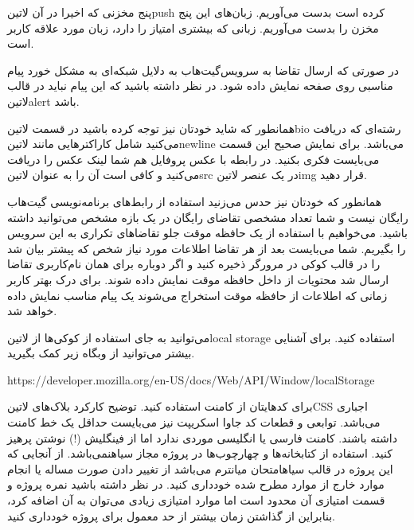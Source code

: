  پنج مخزنی که اخیرا در آن ‌لاتین{push} کرده است بدست می‌آوریم.
 زبان‌های این پنج مخزن را بدست می‌آوریم.
 زبانی که بیشتری امتیاز را دارد، زبان مورد علاقه کاربر است.

در صورتی که ارسال تقاضا به سرویس‌گیت‌هاب به دلایل شبکه‌ای به مشکل خورد پیام مناسبی روی صفحه نمایش داده شود.
در نظر داشته باشید که این پیام نباید در قالب ‌لاتین{alert} باشد.

همانطور که شاید خودتان نیز توجه کرده باشید در قسمت ‌لاتین{bio} رشته‌ای که دریافت می‌کنید شامل کاراکترهایی مانند ‌لاتین{newline} می‌باشد. برای نمایش صحیح این قسمت می‌بایست فکری بکنید.
در رابطه با عکس پروفایل هم شما لینک عکس را دریافت می‌کنید و کافی است آن را به عنوان ‌لاتین{src} در یک عنصر ‌لاتین{img} قرار دهید.

همانطور که خودتان نیز حدس می‌زنید استفاده از رابط‌های برنامه‌نویسی گیت‌هاب رایگان نیست و شما تعداد مشخصی تقاضای رایگان در یک بازه مشخص می‌توانید داشته
باشید. می‌خواهیم با استفاده از یک حافظه موقت جلو تقاضاهای تکراری به این سرویس را بگیریم. شما می‌بایست بعد از هر تقاضا اطلاعات مورد نیاز شخص که پیشتر
بیان شد را در قالب کوکی در مرورگر ذخیره کنید و اگر دوباره برای همان نام‌کاربری تقاضا ارسال شد محتویات از داخل حافظه موقت نمایش داده شوند.
برای درک بهتر کاربر زمانی که اطلاعات از حافظه موقت استخراج می‌شوند یک پیام مناسب نمایش داده خواهد شد.

می‌توانید به جای استفاده از کوکی‌ها از ‌لاتین{local storage} استفاده کنید. برای آشنایی بیشتر می‌توانید از وبگاه زیر کمک بگیرید.


\begin{latin}\begin{center}
https://developer.mozilla.org/en-US/docs/Web/API/Window/localStorage
\end{center}\end{latin}



     برای کدهایتان از کامنت استفاده کنید. توضیح کارکرد بلاک‌های ‌لاتین{CSS} اجباری می‌باشد. توابعی و قطعات کد جاوا اسکریپت نیز می‌بایست حداقل یک خط کامنت داشته باشند.
     کامنت فارسی یا انگلیسی موردی ندارد اما از فینگلیش (!) نوشتن پرهیز کنید.
     استفاده از کتابخانه‌ها و چهارچوب‌ها در پروژه مجاز ‌سیاه{نمی‌باشد}.
     از آنجایی که این پروژه در قالب ‌سیاه{امتحان میانترم} می‌باشد از تغییر دادن صورت مساله یا انجام موارد خارج از موارد مطرح شده خودداری کنید.
     در نظر داشته باشید نمره پروژه و قسمت امتیازی آن محدود است اما موارد امتیازی زیادی می‌توان به آن اضافه کرد، بنابراین از گذاشتن زمان بیشتر از حد معمول برای پروژه خودداری کنید.

